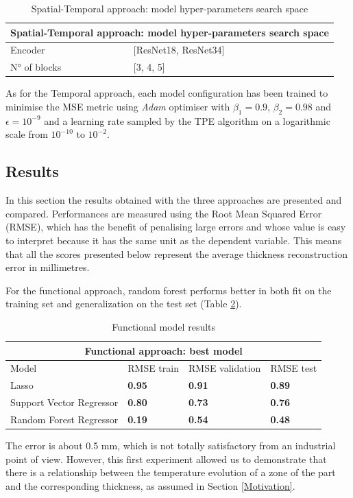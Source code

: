 \begin{table}[h!]
    \centering
    \begin{tabular}{|p{3cm}|p{4cm}| }
    \hline
    \multicolumn{2}{|c|}{Spatial-Temporal approach: model hyper-parameters search space} \\
    \hline
    Encoder & [ResNet18, ResNet34] \\
    \hline
    N° of blocks  & [3, 4, 5] \\
    \hline
    \end{tabular}
    \caption{Spatial-Temporal approach: model hyper-parameters search space}
    \label{tab:spatial_temporal_search_space}
\end{table}

As for the Temporal approach, each model configuration has been trained to minimise the MSE metric using \textit{Adam} optimiser with $\beta_{1} = 0.9$, $\beta_{2} = 0.98$ and $\epsilon = 10^{-9}$ and a learning rate sampled by the TPE algorithm on a logarithmic scale from $10^{-10}$ to $10^{-2}$. 

\subsection{Results}

In this section the results obtained with the three approaches are presented and compared. Performances are measured using the Root Mean Squared Error (RMSE), which has the benefit of penalising large errors and whose value is easy to interpret because it has the same unit as the dependent variable. This means that all the scores presented below represent the average thickness reconstruction error in millimetres.

For the functional approach, random forest performs better in both fit on the training set and generalization on the test set (Table \ref{tab:functional_model_results}).
%
\begin{table}[h!]
    \centering
    \begin{tabular}{|l|p{2.8cm}|p{2.8cm}|p{2.8cm}|}
    \hline
    \multicolumn{4}{|c|}{Functional approach: best model} \\
    \hline
    Model & RMSE train  & RMSE validation  & RMSE test  \\
    \hline
    Lasso & \textbf{0.95} & \textbf{0.91} & \textbf{0.89} \\
    \hline
    Support Vector Regressor & \textbf{0.80} & \textbf{0.73} & \textbf{0.76} \\
    \hline
    Random Forest Regressor & \textbf{0.19} & \textbf{0.54} & \textbf{0.48} \\
    \hline
    \end{tabular}
    \caption{Functional model results}
    \label{tab:functional_model_results}
\end{table}
%
The error is about 0.5 mm, which is not totally satisfactory from an industrial point of view. However, this first experiment allowed us to demonstrate that there is a relationship between the temperature evolution of a zone of the part and the corresponding thickness, as assumed in  Section \ref{Motivation}.

